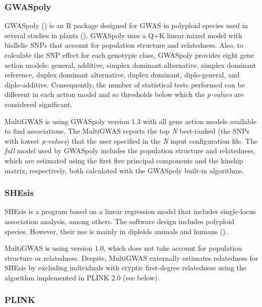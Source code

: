 \documentclass{article}
\begin{document}
\subsubsection{GWASpoly\label{subsec_GWASpoly}}
GWASpoly (\cite{Rosyara2016}) is an R package designed for GWAS in polyploid species used in several studies in plants (\cite{Berdugo2017, Ferrao2018, Sharma2018, Yuan2019}). GWASpoly uses a Q+K linear mixed model with biallelic SNPs that account for population structure and relatedness. Also, to calculate the SNP effect for each genotypic class, GWASpoly provides eight gene action models: general, additive, simplex dominant alternative, simplex dominant reference, duplex dominant alternative, duplex dominant, diplo-general, and diplo-additive. Consequently, the number of statistical tests performed can be different in each action model and so thresholds below which the \emph{p-values} are considered significant.

MultiGWAS is using GWASpoly version 1.3 with all gene action models available to find associations. The MultiGWAS reports the top \emph{N} best-ranked (the SNPs with lowest \emph{p-values})  that the user specified in the \emph{N} input configuration file. The \emph{full }model used by GWASpoly includes the population structure and relatedness, which are estimated using the first five principal components and the kinship matrix, respectively, both calculated with the GWASpoly built-in algorithms.

\subsubsection{SHEsis}

SHEsis is a program based on a linear regression model that includes single-locus association analysis, among others. The software design includes polyploid species. However, their use is mainly in diploids animals and humans (\cite{Qiao2015, Meng2019}).

MultiGWAS is using version 1.0, which does not take account for population structure or relatedness. Despite, MultiGWAS externally estimates relatedness for SHEsis by excluding individuals with cryptic first-degree relatedness using the algorithm implemented in PLINK 2.0 (see below).

\subsubsection{PLINK}
\end{document}
